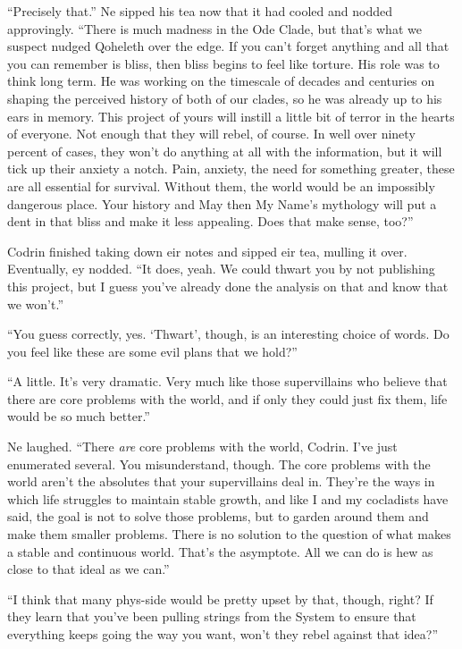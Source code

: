 ``Precisely that.'' Ne sipped his tea now that it had cooled and nodded approvingly. ``There is much madness in the Ode Clade, but that's what we suspect nudged Qoheleth over the edge. If you can't forget anything and all that you can remember is bliss, then bliss begins to feel like torture. His role was to think long term. He was working on the timescale of decades and centuries on shaping the perceived history of both of our clades, so he was already up to his ears in memory. This project of yours will instill a little bit of terror in the hearts of everyone. Not enough that they will rebel, of course. In well over ninety percent of cases, they won't do anything at all with the information, but it will tick up their anxiety a notch. Pain, anxiety, the need for something greater, these are all essential for survival. Without them, the world would be an impossibly dangerous place. Your history and May then My Name's mythology will put a dent in that bliss and make it less appealing. Does that make sense, too?''

Codrin finished taking down eir notes and sipped eir tea, mulling it over. Eventually, ey nodded. ``It does, yeah. We could thwart you by not publishing this project, but I guess you've already done the analysis on that and know that we won't.''

``You guess correctly, yes. `Thwart', though, is an interesting choice of words. Do you feel like these are some evil plans that we hold?''

``A little. It's very dramatic. Very much like those supervillains who believe that there are core problems with the world, and if only they could just fix them, life would be so much better.''

Ne laughed. ``There \emph{are} core problems with the world, Codrin. I've just enumerated several. You misunderstand, though. The core problems with the world aren't the absolutes that your supervillains deal in. They're the ways in which life struggles to maintain stable growth, and like I and my cocladists have said, the goal is not to solve those problems, but to garden around them and make them smaller problems. There is no solution to the question of what makes a stable and continuous world. That's the asymptote. All we can do is hew as close to that ideal as we can.''

``I think that many phys-side would be pretty upset by that, though, right? If they learn that you've been pulling strings from the System to ensure that everything keeps going the way you want, won't they rebel against that idea?''

